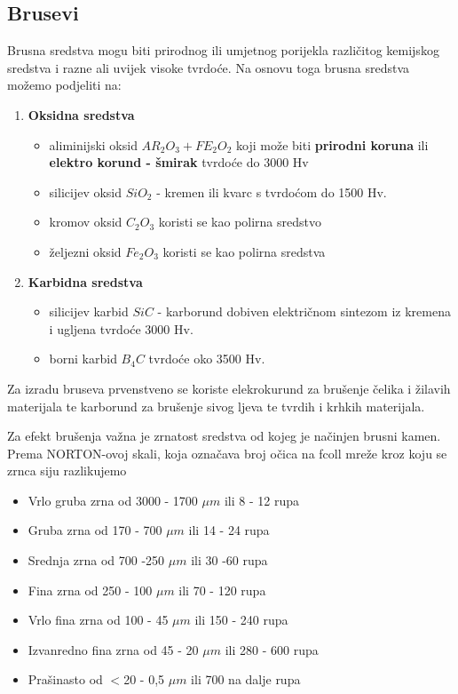 \documentclass[a4paper,12pt]{article}
\numberwithin{figure}{section}
\begin{document}
\subsection{Brusevi}
Brusna sredstva mogu biti prirodnog ili umjetnog porijekla različitog kemijskog sredstva i razne ali uvijek visoke tvrdoće. Na osnovu toga brusna sredstva možemo podjeliti na:
\begin{enumerate}
\item \textbf{Oksidna sredstva}
\begin{itemize}
\item aliminijski oksid $AR_{2}O_{3} + FE_{2}O_{2}$ koji može biti \textbf{prirodni koruna} ili \textbf{elektro korund - šmirak} tvrdoće do 3000 Hv
\item silicijev oksid $SiO_{2}$ - kremen ili kvarc s tvrdoćom do 1500 Hv.
\item kromov oksid $C_{2}O_{3}$ koristi se kao polirna sredstvo
\item željezni oksid $Fe_{2}O_{3}$ koristi se kao polirna sredstva
\end{itemize}
\item \textbf{Karbidna sredstva}
\begin{itemize}
\item silicijev karbid $SiC$ - karborund dobiven električnom sintezom iz kremena i ugljena tvrdoće 3000 Hv.
\item borni karbid $B_{4}C$ tvrdoće oko 3500 Hv.
\end{itemize}
\end{enumerate}
Za izradu bruseva prvenstveno se koriste elekrokurund za brušenje čelika i žilavih materijala te karborund za brušenje sivog ljeva te tvrdih i krhkih materijala. \par
Za efekt brušenja važna je zrnatost sredstva od kojeg je načinjen brusni kamen. Prema NORTON-ovoj skali, koja označava broj očica na fcoll mreže kroz koju se zrnca siju razlikujemo
\begin{itemize}
\item Vrlo gruba zrna od 3000 - 1700 $\mu m$ ili 8 - 12 rupa
\item Gruba zrna od 170 - 700 $\mu m$ ili 14 - 24 rupa
\item Srednja zrna od 700 -250 $\mu m$ ili 30 -60 rupa
\item Fina zrna od 250 - 100 $\mu m$ ili 70 - 120 rupa
\item Vrlo fina zrna od 100 - 45 $\mu m$ ili 150 - 240 rupa
\item Izvanredno fina zrna od 45 - 20 $\mu m$ ili 280 - 600 rupa
\item Prašinasto od $<$20 - 0,5 $\mu m$ ili 700 na dalje rupa
\end{itemize}
\end{document}
